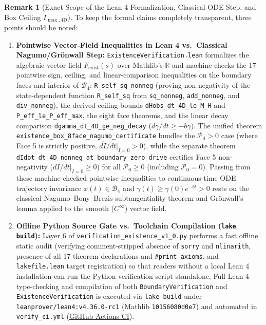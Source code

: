 \documentclass[11pt,a4paper]{article}
\theoremstyle{definition}
\newtheorem{remark}[theorem]{Remark}
\begin{document}
\begin{remark}[Exact Scope of the Lean 4 Formalization, Classical ODE Step, and Box Ceiling $\dot{I}_{\max,4\mathrm{D}}$]
\label{rem:lean_scope}
To keep the formal claims completely transparent, three points should be noted:
\begin{enumerate}
  \item \textbf{Pointwise Vector-Field Inequalities in Lean 4 vs.\ Classical Nagumo/Gr\"onwall Step:} \texttt{ExistenceVerification.lean} formalizes the algebraic vector field $F_{\mathrm{exist}}(s)$ over Mathlib's $\mathbb{R}$ and machine-checks the 17 pointwise sign, ceiling, and linear-comparison inequalities on the boundary faces and interior of $\mathcal{B}_4$: \texttt{R\_self\_sq\_nonneg} (proving non-negativity of the state-dependent function \texttt{R\_self\_sq} from \texttt{sq\_nonneg}, \texttt{add\_nonneg}, and \texttt{div\_nonneg}), the derived ceiling bounds \texttt{dHobs\_dt\_4D\_le\_M\_H} and \texttt{P\_eff\_le\_P\_eff\_max}, the eight face theorems, and the linear decay comparison \texttt{dgamma\_dt\_4D\_ge\_neg\_decay} ($d\gamma/dt \ge -b\gamma$). The unified theorem \texttt{existence\_box\_8face\_nagumo\_certificate} bundles the $\mathcal{P}_0 > 0$ case (where Face 5 is strictly positive, $d\dot{I}/dt|_{\dot{I}=0} > 0$), while the separate theorem \texttt{dIdot\_dt\_4D\_nonneg\_at\_boundary\_zero\_drive} certifies Face 5 non-negativity ($d\dot{I}/dt|_{\dot{I}=0} \ge 0$) for all $\mathcal{P}_0 \ge 0$ (including $\mathcal{P}_0 = 0$). Passing from these machine-checked pointwise inequalities to continuous-time ODE trajectory invariance $x(t) \in \mathcal{B}_4$ and $\gamma(t) \ge \gamma(0)e^{-bt} > 0$ rests on the classical Nagumo--Bony--Brezis subtangentiality theorem and Gr\"onwall's lemma applied to the smooth ($C^\infty$) vector field.
  \item \textbf{Offline Python Source Gate vs.\ Toolchain Compilation (\texttt{lake build}):} Layer 6 of \texttt{verification\_existence\_v1\_0.py} performs a fast offline static audit (verifying comment-stripped absence of \texttt{sorry} and \texttt{nlinarith}, presence of all 17 theorem declarations and \texttt{\#print axioms}, and \texttt{lakefile.lean} target registration) so that readers without a local Lean 4 installation can run the Python verification script standalone. Full Lean 4 type-checking and compilation of both \texttt{BoundaryVerification} and \texttt{ExistenceVerification} is executed via \texttt{lake build} under \texttt{leanprover/lean4:v4.36.0-rc1} (Mathlib \texttt{10156080d0e7}) and automated in \texttt{verify\_ci.yml} (\href{https://github.com/reggaesharkk/theory-of-bounded-existence/actions}{GitHub Actions CI}).

\end{enumerate}
\end{remark}
\end{document}
